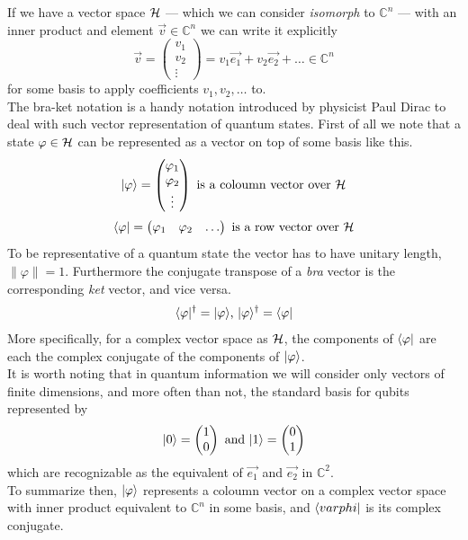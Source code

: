 	 If we have a vector space $\mathcal{H}$ --- which we can consider \textit{isomorph} to $\mathbb{C}^n $ --- with an inner product and element $\vec{v}\in \mathbb{C}^n$ we can write it explicitly 
	$$ \vec{v} =  \begin{pmatrix} v_1 \\ v_2 \\ \vdots \end{pmatrix} = v_1\vec{e_1} + v_2\vec{e_2} + \ldots \in \mathbb{C}^n$$
	for some basis to apply coefficients $v_1, v_2, \ldots$ to.\\
	The bra-ket notation is a handy notation introduced by physicist Paul Dirac to deal with such vector representation of quantum states. First of all we note that a state $\varphi\in\mathcal{H}$ can be represented as a vector on top of some basis like this.
	$$|\varphi \rangle = \begin{pmatrix} \varphi_1 \\ \varphi_2 \\ \vdots \end{pmatrix}	  \text{  is a coloumn vector over } \mathcal{H} $$
	$$\langle \varphi|  = \begin{pmatrix} \varphi_1 & \varphi_2 & \hdots \end{pmatrix} \text{  is a row vector over } \mathcal{H} $$
	To be representative of a quantum state the vector has to have unitary length, $\|\varphi\|= 1$.
	Furthermore the conjugate transpose of a \emph{bra} vector is the corresponding \emph{ket} vector, and vice versa.
	$$ \langle \varphi|^{\dagger} = |\varphi \rangle \text{,    } |\varphi \rangle^{\dagger} = \langle \varphi|$$
	More specifically, for a complex vector space as $\mathcal{H}$, the components of $\langle \varphi|$ are each the complex conjugate of the components of $|\varphi \rangle$.\\
	It is worth noting that in quantum information we will consider only vectors of finite dimensions, and more often than not, the standard basis for qubits represented by
	$$|0 \rangle =  \begin{pmatrix} 1 \\ 0 \end{pmatrix}
	\text{ and }
	|1 \rangle =  \begin{pmatrix} 0 \\ 1 \end{pmatrix}$$
	which are recognizable as the equivalent of $\vec{e_1}$ and $\vec{e_2}$ in $\mathbb{C}^2$.\\
	
	To summarize then, $|\varphi \rangle$ represents a coloumn vector on a complex vector space with inner product equivalent to $\mathbb{C}^n$ in some basis, and $\langle varphi|$ is its complex conjugate.
	
